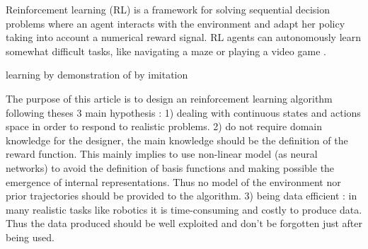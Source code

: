 Reinforcement learning (RL) \cite{Sutton1998} is a framework for solving sequential decision
problems where an agent interacts with the environment and adapt her policy
taking into account a numerical reward signal. RL agents can autonomously
learn somewhat difficult tasks, like navigating a maze or playing a video game \cite{Tesauro1994}.

learning by demonstration of by imitation

The purpose of this article is to design an reinforcement learning algorithm following theses 3 main hypothesis :
1) dealing with continuous states and actions space in order to respond to realistic problems.
2) do not require domain knowledge for the designer, the main knowledge should be the definition of the reward function.
This mainly implies to use non-linear model (as neural networks) to avoid the definition of basis functions and
making possible the emergence of internal representations. Thus no model of the environment nor prior trajectories should
be provided to the algorithm.
3) being data efficient : in many realistic tasks like robotics it is time-consuming and costly to produce data.
Thus the data produced should be well exploited and don't be forgotten just after being used.




